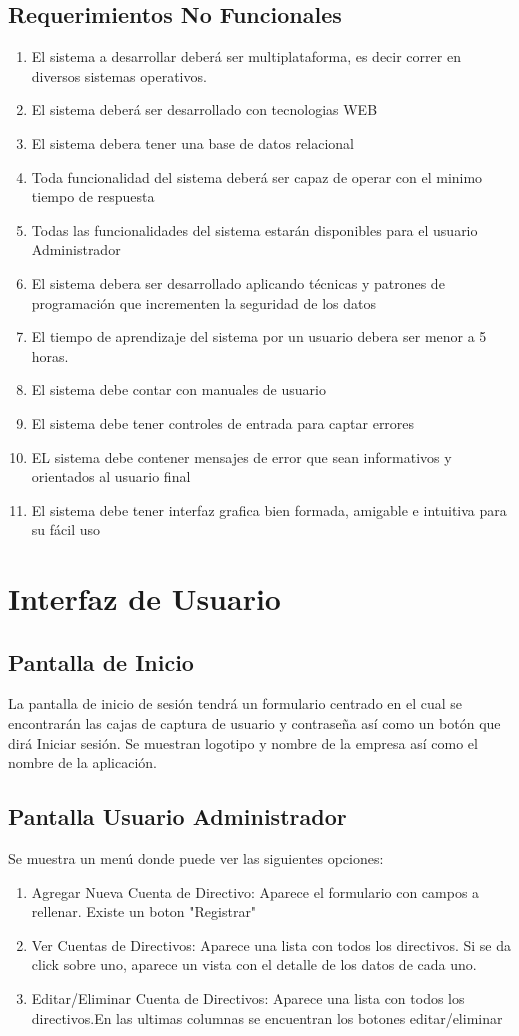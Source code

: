 \documentclass[11pt,a4paper]{article}
\begin{document}
\subsection{Requerimientos No Funcionales}
\begin{enumerate}
\item El sistema a desarrollar deberá ser multiplataforma, es decir correr en 
diversos sistemas operativos.
\item El sistema deberá ser desarrollado con tecnologias WEB
\item El sistema debera tener una base de datos relacional
\item Toda funcionalidad del sistema deberá ser capaz de operar con el minimo tiempo de respuesta
\item Todas las funcionalidades del sistema estarán disponibles para el usuario Administrador
\item El sistema debera ser desarrollado aplicando técnicas y patrones de programación que incrementen
la seguridad de los datos
\item El tiempo de aprendizaje del sistema por un usuario debera ser menor a 5 horas.
\item El sistema debe contar con manuales de usuario
\item El sistema debe tener controles de entrada para captar errores
\item EL sistema debe contener mensajes de error que sean informativos y orientados al usuario final
\item El sistema debe tener interfaz grafica bien formada, amigable e intuitiva para su fácil uso
\end{enumerate}

\section{Interfaz de Usuario}
\subsection{Pantalla de Inicio}
La pantalla de inicio de sesión tendrá un formulario centrado en el cual se encontrarán las cajas de captura de usuario y contraseña
así como un botón que dirá Iniciar sesión. Se muestran logotipo y nombre de la empresa así como el nombre de la aplicación.
\subsection{Pantalla Usuario Administrador}
Se muestra un menú donde puede ver las siguientes opciones:
\begin{enumerate}
\item Agregar Nueva Cuenta de Directivo: Aparece el formulario con campos a rellenar. Existe un boton "Registrar"
\item Ver Cuentas de Directivos: Aparece una lista con todos los directivos. Si se da click sobre uno, aparece un vista con el detalle de los datos de cada uno.
\item Editar/Eliminar Cuenta de Directivos: Aparece una lista con todos los directivos.En las ultimas columnas se encuentran los botones editar/eliminar
\end{enumerate}
\end{document}
